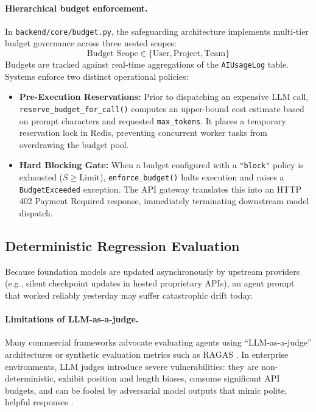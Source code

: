 \documentclass[10pt,a4paper,twocolumn]{article}
\begin{document}
\paragraph{Hierarchical budget enforcement.} In \texttt{backend/core/budget.py}, the safeguarding architecture implements multi-tier budget governance across three nested scopes:
\begin{equation}
\text{Budget Scope} \in \{ \text{User}, \text{Project}, \text{Team} \}
\end{equation}
Budgets are tracked against real-time aggregations of the \texttt{AIUsageLog} table. Systems enforce two distinct operational policies:
\begin{itemize}[leftmargin=*]
  \item \textbf{Pre-Execution Reservations:} Prior to dispatching an expensive LLM call, \texttt{reserve\_budget\_for\_call()} computes an upper-bound cost estimate based on prompt characters and requested \texttt{max\_tokens}. It places a temporary reservation lock in Redis, preventing concurrent worker tasks from overdrawing the budget pool.
  \item \textbf{Hard Blocking Gate:} When a budget configured with a \texttt{"block"} policy is exhausted ($S \ge \text{Limit}$), \texttt{enforce\_budget()} halts execution and raises a \texttt{BudgetExceeded} exception. The API gateway translates this into an HTTP 402 Payment Required response, immediately terminating downstream model dispatch.
\end{itemize}

\subsection{Deterministic Regression Evaluation}
Because foundation models are updated asynchronously by upstream providers (e.g., silent checkpoint updates in hosted proprietary APIs), an agent prompt that worked reliably yesterday may suffer catastrophic drift today. 

\paragraph{Limitations of LLM-as-a-judge.} Many commercial frameworks advocate evaluating agents using ``LLM-as-a-judge'' architectures \cite{zheng2023judge} or synthetic evaluation metrics such as RAGAS \cite{es2024ragas}. In enterprise environments, LLM judges introduce severe vulnerabilities: they are non-deterministic, exhibit position and length biases, consume significant API budgets, and can be fooled by adversarial model outputs that mimic polite, helpful responses \cite{zheng2023judge}.
\end{document}
